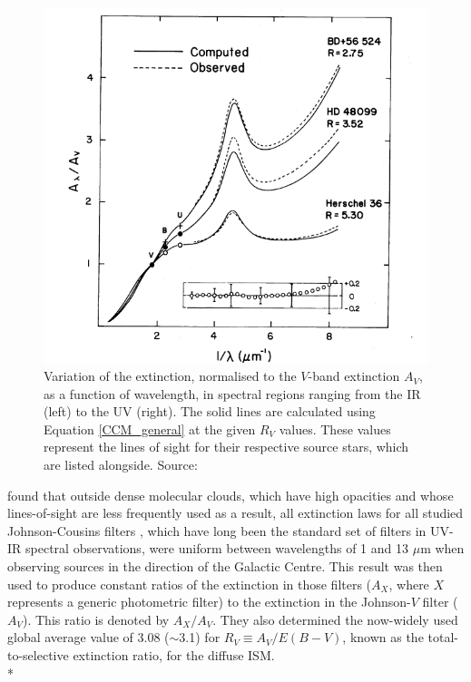 \documentclass[12pt, a4paper]{report}
\begin{document}
\begin{figure}[h]
\begin{center}
\includegraphics[width=1.0\textwidth]{cardelli_curve_fig4_crop.png}
\caption{Variation of the extinction, normalised to the $V$-band extinction $A_{V}$, as a function of wavelength, in spectral regions ranging from the IR (left) to the UV (right). The solid lines are calculated using Equation \ref{CCM_general} at the given $R_{V}$ values. These values represent the lines of sight for their respective source stars, which are listed alongside.  Source: \cite{1989ApJ...345..245C}}
\label{cardelli_curve}
\end{center}
\end{figure}

\cite{1985ApJ...288..618R} found that outside dense molecular clouds, which have high opacities and whose lines-of-sight are less frequently used as a result, all extinction laws for all studied Johnson-Cousins filters \citep{1953ApJ...117..313J}, which have long been the standard set of filters in UV-IR spectral observations, were uniform between wavelengths of 1 and 13 $\mu$m when observing sources in the direction of the Galactic Centre. This result was then used to produce constant ratios of the extinction in those filters ($A_{X}$, where $X$ represents a generic photometric filter) to the extinction in the Johnson-$V$ filter ($A_{V}$). This ratio is denoted by $A_{X}/A_{V}$. They also determined the now-widely used global average value of 3.08 ($\sim$3.1) for $R_{V} \equiv A_{V}/E(B-V)$, known as the total-to-selective extinction ratio,  for the diffuse ISM. \\*
\end{document}
